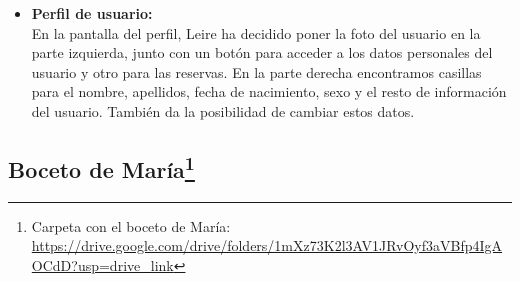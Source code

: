 \begin{itemize}
      \item\textbf{Perfil de usuario:} \\ En la pantalla del perfil, Leire ha decidido poner la foto del usuario en la parte izquierda, junto con un botón para acceder a los datos personales del usuario y otro para las reservas.
            En la parte derecha encontramos casillas para el nombre, apellidos, fecha de nacimiento, sexo y el resto de información del usuario. También da la posibilidad de cambiar estos datos.

\end{itemize}
\subsection[Boceto de María]{Boceto de María\footnote{Carpeta con el boceto de María: \url{https://drive.google.com/drive/folders/1mXz73K2l3AV1JRvOyf3aVBfp4IgAOCdD?usp=drive_link}}}

